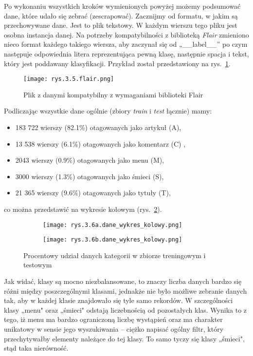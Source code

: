 Po wykonaniu wszystkich kroków wymienionych powyżej możemy podsumować dane, które udało się zebrać (zescrapować). 
Zacznijmy od formatu, w jakim są przechowywane dane. Jest to plik tekstowy. W każdym wierszu tego pliku jest osobna instancja danej. Na potrzeby kompatybilności z biblioteką \emph{Flair} zmieniono nieco format każdego takiego wiersza, aby zaczynał się od „\_\_label\_\_” po czym następuje odpowiednia litera reprezentująca pewną klasę, następnie spacja i tekst, który jest poddawany klasyfikacji. 
Przykład został przedstawiony na rys.~\ref{fig:3.5}.
\begin{figure}[h]
    \centering
    \texttt{[image: rys.3.5.flair.png]}
    \caption{Plik z danymi kompatybilny z wymaganiami biblioteki Flair}
    \label{fig:3.5}
\end{figure}
Podliczając wszystkie dane ogólnie (zbiory \emph{train} i \emph{test} łącznie) mamy:
\begin{itemize}[label=\textbullet]
\item 183 722 wierszy (82.1\%) otagowanych jako artykuł (A),
\item 13 538 wierszy (6.1\%) otagowanych jako komentarz (C) , 
\item 2043 wierszy (0.9\%) otagowanych jako menu (M),
\item 3000 wierszy (1.3\%) otagowanych jako śmieci (S),
\item 21 365 wierszy (9.6\%) otagowanych jako tytuły (T),
\end{itemize}
co można przedstawić na wykresie kołowym (rys.~\ref{fig:3.6}).
\begin{figure}[h]
	\centering
	\begin{subfigure}{0.45\textwidth}
	    \centering
	    \texttt{[image: rys.3.6a.dane\_wykres\_kolowy.png]}
	\end{subfigure}
	\begin{subfigure}{0.45\textwidth}
	    \centering
	    \texttt{[image: rys.3.6b.dane\_wykres\_kolowy.png]}
	\end{subfigure}
	\label{fig:3.6}
	\caption{Procentowy udział danych kategorii w zbiorze treningowym i testowym}
\end{figure}
Jak widać, klasy są mocno niezbalansowane, to znaczy liczba danych bardzo się różni między poszczególnymi klasami, jednakże nie było możliwe zebranie danych tak, aby w każdej klasie znajdowało się tyle samo rekordów. W szczególności klasy „menu" oraz „śmieci" odstają liczebnością od pozostałych klas. Wynika to z tego, iż menu ma bardzo ograniczoną liczbę wystąpień oraz ma charakter unikatowy w sensie jego wyszukiwania – ciężko napisać ogólny filtr, który przechytywałby elementy należące do tej klasy. To samo tyczy się klasy „śmieci", stąd taka nierówność.

